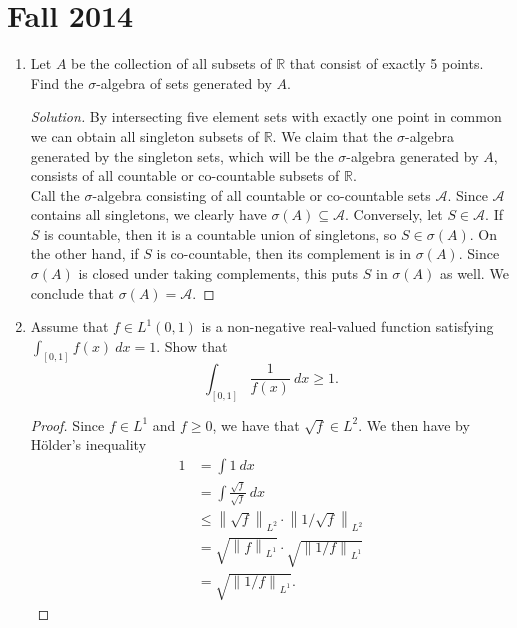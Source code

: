 \documentclass[11pt,letterpaper]{report}
\newcommand{\reals}{\mathbb{R}}
\newcommand{\mcal}[1]{\mathcal{#1}}
\newcommand{\Lp}[2]{\left\|{#1}\right\|_{L^{#2}}}
\newenvironment{solution}
{\begin{proof}[Solution]}
{\end{proof}}
\begin{document}
\section{Fall 2014}
\begin{enumerate}
	\item Let $A$ be the collection of all subsets of $\reals$ that consist of exactly 5 points. Find the $\sigma$-algebra of sets generated by $A$.
	\begin{solution}
		By intersecting five element sets with exactly one point in common we can obtain all singleton subsets of $\mathbb{R}$. We claim that the $\sigma$-algebra generated by the singleton sets, which will be the $\sigma$-algebra generated by $A$, consists of all countable or co-countable subsets of $\mathbb{R}$.\\

		\noindent Call the $\sigma$-algebra consisting of all countable or co-countable sets $\mcal{A}$. Since $\mcal{A}$ contains all singletons, we clearly have $\sigma(A)\subseteq \mcal{A}$. Conversely, let $S\in \mcal{A}$. If $S$ is countable, then it is a countable union of singletons, so $S\in \sigma(A)$. On the other hand, if $S$ is co-countable, then its complement is in $\sigma(A)$. Since $\sigma(A)$ is closed under taking complements, this puts $S$ in $\sigma(A)$ as well. We conclude that $\sigma(A) = \mcal{A}$.
	\end{solution}

	\item Assume that $f\in L^1(0, 1)$ is a non-negative real-valued function satisfying $\int_{[0,1]}f(x)\ dx = 1$. Show that
	\[
	\int_{[0,1]}\frac{1}{f(x)}\ dx \geq 1.
	\]
	\begin{proof}
		Since $f\in L^1$ and $f\geq 0$, we have that $\sqrt{f}\in L^2$. We then have by H\"older's inequality
		\begin{align*}
			1 &= \int 1\ dx\\
			&= \int \frac{\sqrt{f}}{\sqrt{f}}\ dx\\
			&\leq \Lp{\sqrt{f}}{2} \cdot \Lp{1/\sqrt{f}}{2}\\
			&= \sqrt{\Lp{f}{1}}\cdot \sqrt{\Lp{1/f}{1}}\\
			&= \sqrt{\Lp{1/f}{1}}.
		\end{align*}
	\end{proof}


\end{enumerate}
\end{document}
